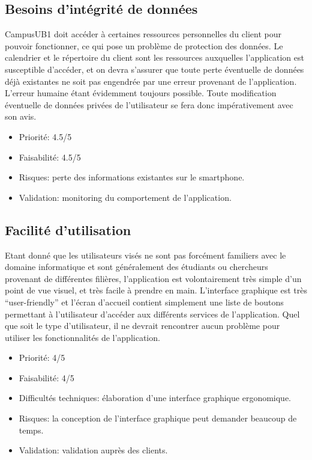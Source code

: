 \documentclass [pdftex,12pt] {report}
\begin{document}
\subsection{Besoins d'intégrité de données}
CampusUB1 doit accéder à certaines ressources personnelles du client pour pouvoir fonctionner, ce qui pose un problème de protection des données. Le calendrier et le répertoire du client sont les ressources auxquelles l'application est susceptible d'accéder, et on devra s'assurer que toute perte éventuelle de données déjà existantes ne soit pas engendrée par une erreur provenant de l'application. L'erreur humaine étant évidemment toujours possible. Toute modification éventuelle de données privées de l'utilisateur se fera donc impérativement avec son avis. \\

\begin{itemize}
\renewcommand{\labelitemi}{$\bullet$}
\item Priorité: 4.5/5
\item Faisabilité: 4.5/5
\item Risques: perte des informations existantes sur le smartphone.
\item Validation: monitoring du comportement de l'application.
\end{itemize} 

\subsection{Facilité d'utilisation}
Etant donné que les utilisateurs visés ne sont pas forcément familiers avec le domaine informatique et sont généralement des étudiants ou chercheurs provenant de différentes filières, l'application est volontairement très simple d'un point de vue visuel, et très facile à prendre en main. L'interface graphique est très ``user-friendly'' et l'écran d'accueil contient simplement une liste de boutons permettant à l'utilisateur d'accéder aux différents services de l'application. Quel que soit le type d'utilisateur, il ne devrait rencontrer aucun problème pour utiliser les fonctionnalités de l'application. \\

\begin{itemize}
\renewcommand{\labelitemi}{$\bullet$}
\item Priorité: 4/5
\item Faisabilité: 4/5
\item Difficultés techniques: élaboration d'une interface graphique ergonomique.
\item Risques: la conception de l'interface graphique peut demander beaucoup de temps.
\item Validation: validation auprès des clients.
\end{itemize} 
\end{document}
